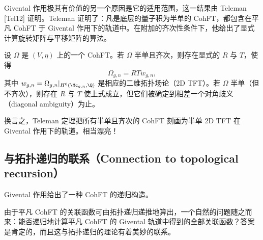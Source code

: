
Givental 作用极其有价值的另一个原因是它的适用范围，这一结果由 Teleman [Tel12] 证明。Teleman 证明了：凡是底层的量子积为半单的 CohFT，都包含在平凡 CohFT 于 Givental 作用下的轨道中。在附加的齐次性条件下，他给出了显式计算旋转矩阵与平移矩阵的算法。

\begin{theorem}[3.8（Teleman 分类）]
设 $\Omega$ 是 $(V,\eta)$ 上的一个 CohFT。若 $\Omega$ 半单且齐次，则存在显式的 $R$ 与 $T$，使得
\begin{equation}
  \Omega_{g,n}=RTw_{g,n},
  \tag{3.50}
\end{equation}
其中 $w_{g,n}=\Omega_{g,n}|_{H^0(\Mc_{g,n},\Q)}$ 是相应的二维拓扑场论（2D TFT）。若 $\Omega$ 半单（但不齐次），则存在 $R$ 与 $T$ 使上式成立，但它们被确定到相差一个对角歧义（diagonal ambiguity）为止。
\end{theorem}


换言之，Teleman 定理把所有半单且齐次的 CohFT 刻画为半单 2D TFT 在 Givental 作用下的轨道。相当漂亮！


\subsection{与拓扑递归的联系（Connection to topological recursion）}

Givental 作用给出了一种 CohFT 的递归构造。

由于平凡 CohFT 的关联函数可由拓扑递归递推地算出，一个自然的问题随之而来：能否递归地计算平凡 CohFT 的 Givental 轨道中得到的全部关联函数？答案是肯定的，而且这与拓扑递归的理论有着美妙的联系。

